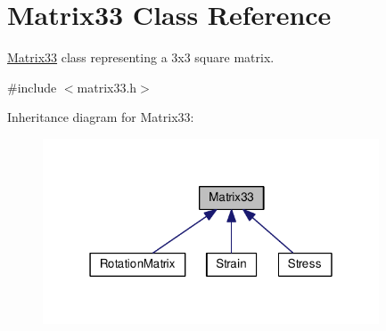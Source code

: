 \hypertarget{classMatrix33}{\section{Matrix33 Class Reference}
\label{de/d82/classMatrix33}
}


\hyperlink{classMatrix33}{Matrix33} class representing a 3x3 square matrix.  




{\ttfamily \#include $<$matrix33.\-h$>$}



Inheritance diagram for Matrix33\-:
\nopagebreak
\begin{figure}[H]
\begin{center}
\leavevmode
\includegraphics[width=283pt]{dc/dfe/classMatrix33__inherit__graph}
\end{center}
\end{figure}

